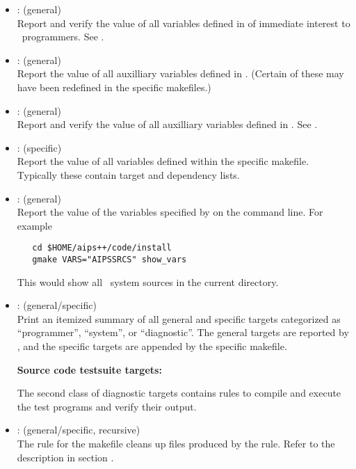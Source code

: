 \begin{itemize}
\item
    : (general)
   \\ Report and verify the value of all variables defined in 
   of immediate interest to \aipspp\ programmers.  See .

\item
     : (general)
   \\ Report the value of all auxilliary variables defined in .
   (Certain of these may have been redefined in the specific makefiles.)

\item
     : (general)
   \\ Report and verify the value of all auxilliary variables defined in
   .  See .

\item
    : (specific)
   \\ Report the value of all variables defined within the specific makefile.
   Typically these contain target and dependency lists.

\item
    : (general)
   \\ Report the value of the  variables specified by
    on the  command line.  For example
 
\begin{verbatim}
   cd $HOME/aips++/code/install
   gmake VARS="AIPSSRCS" show_vars
\end{verbatim}
 
   \noindent
   This would show all \aipspp\ system sources in the current directory.

\item
    : (general/specific)
   \\ Print an itemized summary of all general and specific targets categorized
   as ``programmer'', ``system'', or ``diagnostic''.  The general targets are
   reported by , and the specific targets are appended by the
   specific makefile.

\noindent
\textbf{Source code testsuite targets:}

\noindent
The second class of diagnostic targets contains rules to compile and execute
the test programs and verify their output.

\item
    : (general/specific, recursive)
   \\ The  rule for the  makefile cleans up files
   produced by the  rule.  Refer to the description in section
   .


\end{itemize}
